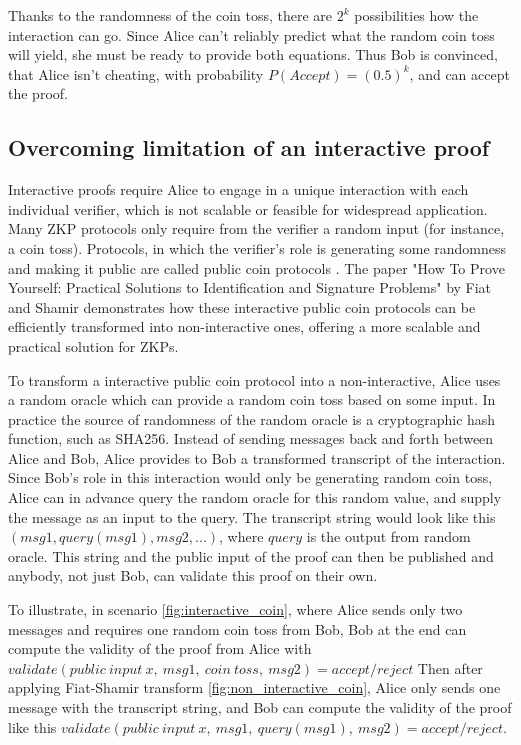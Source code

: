 \documentclass[conference,comsoc,10pt]{IEEEtran}
\begin{document}
        Thanks to the randomness of the coin toss, there are $2^k$ possibilities how
        the interaction can go. Since Alice can't reliably predict what the random
        coin toss will yield, she must be ready to provide both equations. Thus Bob is
        convinced, that Alice isn't cheating, with probability $P(Accept) = (0.5)^k$,
        and can accept the proof.

    \subsection{Overcoming limitation of an interactive proof}
        Interactive proofs require Alice to engage in a unique interaction with
        each individual verifier, which is not scalable or feasible for widespread
        application. Many ZKP protocols only require from the verifier a random input
        (for instance, a coin toss). Protocols, in which the verifier's role is
        generating some randomness and making it public are called public coin
        protocols \cite{Babai1988,Goldwasser1986}. The paper "How To Prove
        Yourself: Practical Solutions to Identification and Signature Problems"
        \cite{Fiat} by Fiat and Shamir demonstrates how these interactive public
        coin protocols can be efficiently transformed into non-interactive ones,
        offering a more scalable and practical solution for ZKPs.

        To transform a interactive public coin protocol into a non-interactive,
        Alice uses a random oracle which can provide a random coin toss based on some
        input. In practice the source of randomness of the random oracle is a
        cryptographic hash function, such as SHA256. Instead of sending messages back
        and forth between Alice and Bob, Alice provides to Bob a transformed
        transcript of the interaction. Since Bob's role in this interaction would only
        be generating random coin toss, Alice can in advance query the random oracle
        for this random value, and supply the message as an input to the query. The
        transcript string would look like this $(msg1, query(msg1), msg2, ...)$, where $query$ is
        the output from random oracle. This string and the public input of the proof
        can then be published and anybody, not just Bob, can validate this proof
        on their own.

        To illustrate, in scenario \ref{fig:interactive_coin}, where Alice
        sends only two messages and requires one random coin toss from Bob,
        Bob at the end can compute the validity of the proof from Alice with
        $validate(public\:input\:x,\:msg1,\:coin\:toss,\:msg2) = accept/reject$
        Then after applying Fiat-Shamir transform \ref{fig:non_interactive_coin},
        Alice only sends one message with the transcript string, and Bob can
        compute the validity of the proof like this
        $validate(public\:input\:x,\:msg1,\:query(msg1),\:msg2) = accept/reject$.
\end{document}

